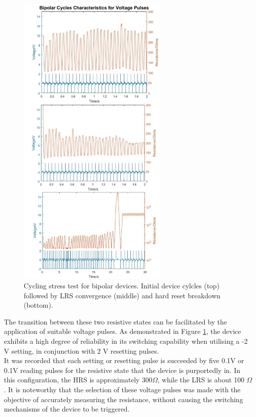 \begin{figure}[htbp!] 
    \centering    
    \includegraphics[width=0.65\textwidth]{Chapter3/Figs/n.png}
    \caption[Cycling stress test for bipolar devices.]{Cycling stress test for bipolar devices. Initial device cylcles (top) followed by LRS convergence (middle) and hard reset breakdown (bottom).}
    \label{fig:3n}
\end{figure}

\noindent The transition between these two resistive states can be facilitated by the application of suitable voltage pulses. As demonstrated in Figure \ref{fig:3n}, the device exhibits a high degree of reliability in its switching capability when utilising a -2 V setting, in conjunction with 2 V resetting pulses. \\


\noindent It was recorded that each setting or resetting pulse is succeeded by five 0.1V or 0.1V reading pulses for the resistive state that the device is purportedly in. In this configuration, the HRS is approximately 300$\Omega$, while the LRS is about 100 $\Omega$. It is noteworthy that the selection of these voltage pulses was made with the objective of accurately measuring the resistance, without causing the switching mechanisms of the device to be triggered.\\

